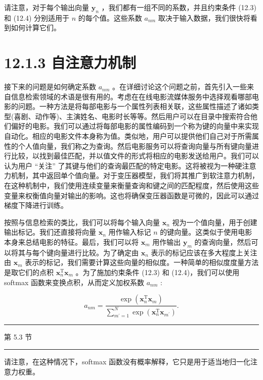 \documentclass[10pt]{report}
\newcommand{\HRule}{\begin{center}\rule{0.9\linewidth}{0.2mm}\end{center}}
\begin{document}
请注意，对于每个输出向量 \({\mathbf{y}}_{n}\) ，我们都有一组不同的系数，并且约束条件 (12.3) 和 (12.4) 分别适用于 \(n\) 的每个值。这些系数 \({a}_{nm}\) 取决于输入数据，我们很快将看到如何计算它们。

\section*{12.1.3 自注意力机制}

接下来的问题是如何确定系数 \({a}_{nm}\) 。在详细讨论这个问题之前，首先引入一些来自信息检索领域的术语是很有用的。考虑在在线电影流媒体服务中选择观看哪部电影的问题。一种方法是将每部电影与一个属性列表相关联，这些属性描述了诸如类型(喜剧、动作等)、主演姓名、电影时长等等。然后用户可以在目录中搜索符合他们偏好的电影。我们可以通过将每部电影的属性编码到一个称为键的向量中来实现自动化。相应的电影文件本身称为值。类似地，用户可以提供他们自己对于所需属性的个人值向量，我们称之为查询。然后电影服务可以将查询向量与所有键向量进行比较，以找到最佳匹配，并以值文件的形式将相应的电影发送给用户。我们可以认为用户 “关注” 了其键与他们的查询最匹配的特定电影。这将被视为一种硬注意力机制，其中返回单个值向量。对于变压器模型，我们将其推广到软注意力机制，在这种机制中，我们使用连续变量来衡量查询和键之间的匹配程度，然后使用这些变量来权衡值向量对输出的影响。这也将确保变压器函数是可微的，因此可以通过梯度下降进行训练。

按照与信息检索的类比，我们可以将每个输入向量 \({\mathbf{x}}_{n}\) 视为一个值向量，用于创建输出标记。我们还直接将向量 \({\mathbf{x}}_{n}\) 用作输入标记 \(n\) 的键向量。这类似于使用电影本身来总结电影的特征。最后，我们可以将 \({\mathbf{x}}_{m}\) 用作输出 \({\mathbf{y}}_{m}\) 的查询向量，然后可以将其与每个键向量进行比较。为了确定由 \({\mathbf{x}}_{n}\) 表示的标记应该在多大程度上关注由 \({\mathbf{x}}_{m}\) 表示的标记，我们需要计算这些向量的相似度。一种简单的相似度度量方法是取它们的点积 \({\mathbf{x}}_{n}^{\mathrm{T}}{\mathbf{x}}_{m}\) 。为了施加约束条件 (12.3) 和 (12.4)，我们可以使用 softmax 函数来变换点积，从而定义加权系数 \({a}_{nm}\) :

\[
{a}_{nm} = \frac{\exp \left( {{\mathbf{x}}_{n}^{\mathrm{T}}{\mathbf{x}}_{m}}\right) }{\mathop{\sum }\limits_{{{m}^{\prime } = 1}}^{N}\exp \left( {{\mathbf{x}}_{n}^{\mathrm{T}}{\mathbf{x}}_{{m}^{\prime }}}\right) }. \tag{12.5}
\]

\HRule

第 5.3 节

\HRule

请注意，在这种情况下，softmax 函数没有概率解释，它只是用于适当地归一化注意力权重。
\end{document}
